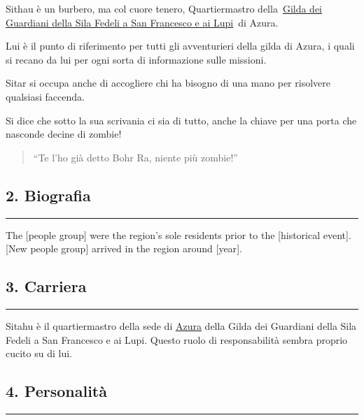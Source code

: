 Sithau è un burbero, ma col cuore tenero, Quartiermastro
della~\href{https://kanka.io/en/campaign/188732/organisations/213470}{Gilda
dei Guardiani della Sila Fedeli a San Francesco e ai Lupi}~di Azura.

Lui è il punto di riferimento per tutti gli avventurieri della gilda di
Azura, i quali si recano da lui per ogni sorta di informazione sulle
missioni.

Sitar si occupa anche di accogliere chi ha bisogno di una mano per
risolvere qualsiasi faccenda.

Si dice che sotto la sua scrivania ci sia di tutto, anche la chiave per
una porta che nasconde decine di zombie!

\begin{quote}
``Te l'ho già detto Bohr Ra, niente più zombie!''
\end{quote}

\subsection{2. Biografia}\label{biografia}

\begin{center}\rule{0.5\linewidth}{0.5pt}\end{center}

The {[}people group{]} were the region's sole residents prior to the
{[}historical event{]}. {[}New people group{]} arrived in the region
around {[}year{]}.

\subsection{3. Carriera}\label{carriera}

\begin{center}\rule{0.5\linewidth}{0.5pt}\end{center}

Sitahu è il quartiermastro della sede di
\href{Azura\%207c14164a934a40648d94bf415b52eee0.md}{Azura} della Gilda
dei Guardiani della Sila Fedeli a San Francesco e ai Lupi. Questo ruolo
di responsabilità sembra proprio cucito su di lui.

\subsection{4. Personalità}\label{personalituxe0}

\begin{center}\rule{0.5\linewidth}{0.5pt}\end{center}

